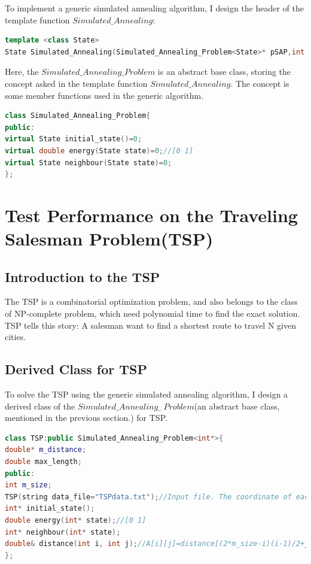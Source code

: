 \documentclass[10.5pt,a4paper]{article}
\begin{document}
To implement a generic simulated annealing algorithm, I design the header of the template function $Simulated\_Annealing$:
\begin{lstlisting}[language=c++]
template <class State>
State Simulated_Annealing(Simulated_Annealing_Problem<State>* pSAP,int iteration=100000,double downratio=0.999, string file_name="Simulated_Path.txt",void m_free(State pst)=my_free, double m_next(double current_temperature,double downratio)=my_next,double Acceptance(Simulated_Annealing_Problem<State>* pSAP,State st1, State st2, double temperature)=my_Acceptance );
\end{lstlisting}
Here, the $Simulated\_Annealing\_Problem$ is an abstract base class, storing the concept asked in the template function $Simulated\_Annealing$. The concept is some member functions used in the generic algorithm.
\begin{lstlisting}[language=c++]
class Simulated_Annealing_Problem{
public:
virtual State initial_state()=0;
virtual double energy(State state)=0;//[0 1]
virtual State neighbour(State state)=0;
};
\end{lstlisting}
\section{Test Performance on the Traveling Salesman Problem(TSP)}
\subsection{Introduction to the TSP}
The TSP is a combinatorial optimization problem, and also belongs to the class of NP-complete problem, which need polynomial time to find the exact solution. TSP tells this story: A salesman want to find a shortest route to travel N given cities.
\subsection{Derived Class for TSP}
To solve the TSP using the generic simulated annealing algorithm, I design a derived class of the $Simulated\_Annealing\_$ $Problem$(an abstract base class, mentioned in the previous section.) for TSP.


\begin{lstlisting}[language=c++]
class TSP:public Simulated_Annealing_Problem<int*>{
double* m_distance;
double max_length;
public:
int m_size;
TSP(string data_file="TSPdata.txt");//Input file. The coordinate of each city.
int* initial_state();
double energy(int* state);//[0 1]
int* neighbour(int* state);
double& distance(int i, int j);//A[i][j]=distance[(2*m_size-i)(i-1)/2+j-i];
};
\end{lstlisting}
\end{document}
